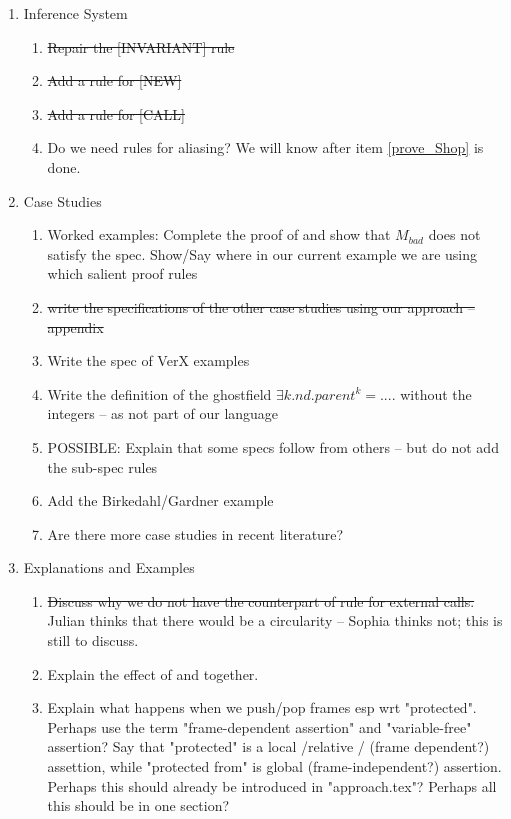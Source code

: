 \documentclass[acmsmall,review,anonymous]{acmart}\settopmatter{printfolios=true}
\begin{document}
 
\begin{enumerate}
\item
Inference System
\begin{enumerate}
\item
\st{Repair the [INVARIANT] rule}

\item
\st{Add a rule for [NEW]}

\item
\st{Add a rule for [CALL]}

\item
Do we need rules for aliasing? We will know after item \ref{prove_Shop} is done.
\end{enumerate}


\item 
Case Studies 
\begin{enumerate}
\item
\label{prove_Shop}
Worked examples: Complete the proof of  and show that $M_{bad}$ does not satisfy the spec.  
Show/Say where in our current example we are using which salient proof rules

\item
\st{write the specifications of the other case studies using our approach -- appendix} 
\item
Write the spec of VerX examples

\item
Write the definition of the ghostfield $\exists k. nd.parent ^k = ....$ without the integers -- as not part of our language

\item
POSSIBLE: Explain that some specs follow from others -- but do not add the sub-spec rules

\item
Add the Birkedahl/Gardner example

\item
Are there more case studies in recent literature? 

\end{enumerate}
\item
Explanations  and Examples
\begin{enumerate}

\item 
\st{Discuss why we do not have the counterpart of rule {}  for external calls. } 
Julian thinks that there would be a circularity -- Sophia thinks not; this is still to discuss.  

\item
Explain the effect of {} and {}  together. 
\item
Explain what happens when we push/pop frames esp wrt "protected".  Perhaps use the term "frame-dependent assertion" and "variable-free" assertion? Say that "protected" is a local /relative / (frame dependent?) assettion, while "protected from" is global (frame-independent?) assertion. Perhaps this should already be introduced in "approach.tex"?
Perhaps all this should be in one section?


\end{enumerate}
\end{enumerate}
\end{document}
